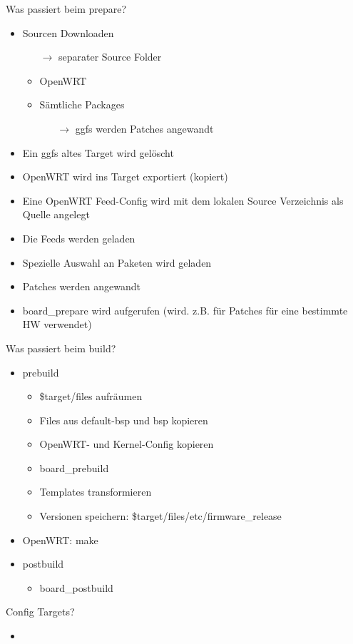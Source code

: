 \begin{frame}{Was passiert beim prepare?}
    \begin{itemize}
        \item Sourcen Downloaden
        \begin{itemize}
            \item[$\rightarrow$] separater Source Folder
            \item OpenWRT
            \item Sämtliche Packages
            \begin{itemize}
                \item[$\rightarrow$] ggfs werden Patches angewandt
            \end{itemize}
        \end{itemize}
        \item Ein ggfs altes Target wird gelöscht
        \item OpenWRT wird ins Target exportiert (kopiert)
        \item Eine OpenWRT Feed-Config wird mit dem lokalen Source Verzeichnis als Quelle angelegt
        \item Die Feeds werden geladen
        \item Spezielle Auswahl an Paketen wird geladen
        \item Patches werden angewandt
        \item board\_prepare wird aufgerufen (wird. z.B. für Patches für eine bestimmte HW verwendet)
    \end{itemize}
\end{frame}

\begin{frame}{Was passiert beim build?}
    \begin{itemize}
        \item prebuild
        \begin{itemize}
            \item \$target/files aufräumen
            \item Files aus default-bsp und bsp kopieren
            \item OpenWRT- und Kernel-Config kopieren
            \item board\_prebuild
            \item Templates transformieren
            \item Versionen speichern: \$target/files/etc/firmware\_release
        \end{itemize}
        \item OpenWRT: make
        \item postbuild
        \begin{itemize}
            \item board\_postbuild
        \end{itemize}
    \end{itemize}
\end{frame}

\begin{frame}{Config Targets?}
    \begin{itemize}
        \item
    \end{itemize}
\end{frame}


